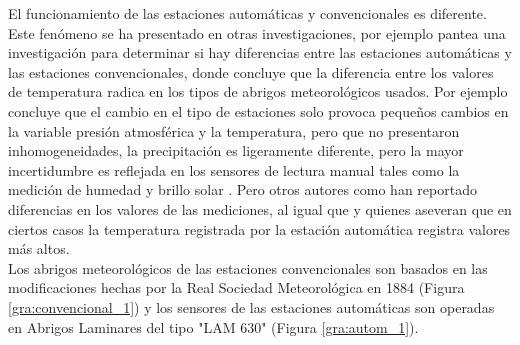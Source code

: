 El funcionamiento de las estaciones automáticas y convencionales es diferente. Este fenómeno se ha presentado en otras investigaciones, por ejemplo \citet{auchmann2012physics} pantea una investigación para determinar si hay diferencias entre las estaciones automáticas y las estaciones convencionales, donde concluye que la diferencia entre los valores de temperatura radica en los tipos de abrigos meteorológicos usados. Por ejemplo \citet{augter2013vergleich} concluye que el cambio en el tipo de estaciones solo provoca pequeños cambios en la variable presión atmosférica y la temperatura, pero que no presentaron inhomogeneidades, la precipitación es ligeramente diferente, pero la mayor incertidumbre es reflejada en los sensores de lectura manual tales como la medición de humedad y brillo solar \citep{augter2013vergleich}. Pero otros autores como \citet{kamtz1831lehrbuch} han reportado diferencias en los valores de las mediciones, al igual que \citet{lacombe2010results} y \citep{kaspar2016climate} quienes aseveran que en ciertos casos la temperatura registrada por la estación automática registra valores más altos.\\

Los abrigos meteorológicos de las estaciones convencionales son basados en las modificaciones hechas por la Real Sociedad Meteorológica en 1884 (Figura \ref{gra:convencional_1}) y los sensores de las estaciones automáticas son operadas en Abrigos Laminares del tipo "LAM 630" (Figura \ref{gra:autom_1}).

